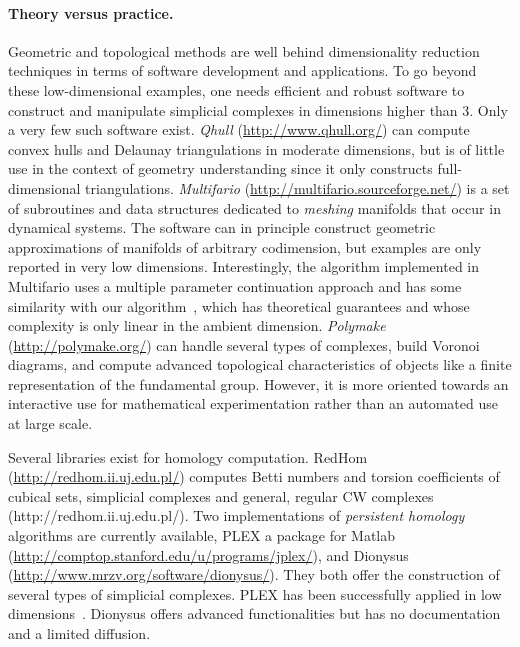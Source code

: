 \paragraph{Theory versus practice.} 
Geometric and topological methods are well behind dimensionality reduction techniques in terms of 
software development and applications.  
%
%
To go beyond these low-dimensional examples, one needs efficient and robust software to construct and manipulate simplicial complexes in dimensions higher than 3.  Only a very few such software exist.  {\em Qhull} (\url{http://www.qhull.org/}{}) can compute convex hulls and Delaunay triangulations in moderate dimensions, but is of little use in the context of geometry understanding since it only constructs full-dimensional triangulations. {\em Multifario} (\url{http://multifario.sourceforge.net/}{}) is a set of subroutines and data structures dedicated to {\em meshing} manifolds that occur in dynamical systems. The software can in principle construct geometric approximations of manifolds of arbitrary codimension, but examples are only reported in very low dimensions. Interestingly, the algorithm implemented in Multifario  uses a multiple parameter continuation approach and has some similarity with our algorithm~\cite{boissonnat2010meshing}, which has theoretical guarantees and whose complexity is only linear in the ambient dimension.  {\em Polymake} (\url{http://polymake.org/}{}) can handle several types of complexes, build Voronoi diagrams, and compute advanced topological characteristics of objects like a finite representation of the fundamental group. However, it is more oriented towards an interactive use for mathematical experimentation
rather than  an automated use at large scale.%

Several libraries exist for homology computation. RedHom (\url{http://redhom.ii.uj.edu.pl/}{}) computes Betti numbers and torsion coefficients of cubical sets, simplicial complexes and general, regular CW complexes (http://redhom.ii.uj.edu.pl/).
Two implementations of {\em persistent homology} algorithms are currently available, PLEX a package for Matlab (\url{http://comptop.stanford.edu/u/programs/jplex/}{}), and  Dionysus (\url{http://www.mrzv.org/software/dionysus/}{}). They both offer the construction of several types of simplicial complexes. PLEX has been  successfully applied in low dimensions~\cite{fpgo-airc-2009,rg-bptd-2008}. Dionysus offers advanced
functionalities but has no documentation and a limited diffusion.
\vspace{2mm}

